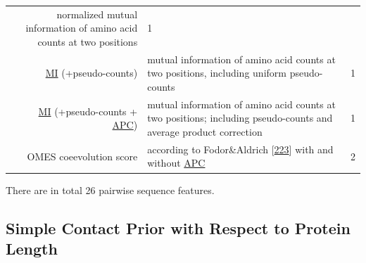 \documentclass[11pt,a4paper,twoside]{book}
\theoremstyle{definition}
\theoremstyle{definition}
\theoremstyle{remark}
\begin{document}
\begin{longtable}[]{@{}rlc@{}}
\begin{minipage}[t]{0.50\columnwidth}
normalized mutual information of amino acid counts at two
positions\strut
\end{minipage} & \begin{minipage}[t]{0.18\columnwidth}\centering\strut
1\strut
\end{minipage}\tabularnewline
\begin{minipage}[t]{0.23\columnwidth}\raggedleft\strut
\protect\hyperlink{abbrev}{MI} (+pseudo-counts)\strut
\end{minipage} & \begin{minipage}[t]{0.50\columnwidth}\raggedright\strut
mutual information of amino acid counts at two positions, including
uniform pseudo-counts\strut
\end{minipage} & \begin{minipage}[t]{0.18\columnwidth}\centering\strut
1\strut
\end{minipage}\tabularnewline
\begin{minipage}[t]{0.23\columnwidth}\raggedleft\strut
\protect\hyperlink{abbrev}{MI} (+pseudo-counts +
\protect\hyperlink{abbrev}{APC})\strut
\end{minipage} & \begin{minipage}[t]{0.50\columnwidth}\raggedright\strut
mutual information of amino acid counts at two positions; including
pseudo-counts and average product correction\strut
\end{minipage} & \begin{minipage}[t]{0.18\columnwidth}\centering\strut
1\strut
\end{minipage}\tabularnewline
\begin{minipage}[t]{0.23\columnwidth}\raggedleft\strut
OMES coeevolution score\strut
\end{minipage} & \begin{minipage}[t]{0.50\columnwidth}\raggedright\strut
according to Fodor\&Aldrich
{[}\protect\hyperlink{ref-Fodor2004a}{223}{]} with and without
\protect\hyperlink{abbrev}{APC}\strut
\end{minipage} & \begin{minipage}[t]{0.18\columnwidth}\centering\strut
2\strut
\end{minipage}\tabularnewline
\bottomrule
\end{longtable}

There are in total 26 pairwise sequence features.

\subsection{Simple Contact Prior with Respect to Protein
Length}\label{simple-contact-prior-with-respect-to-protein-length}
\end{document}
